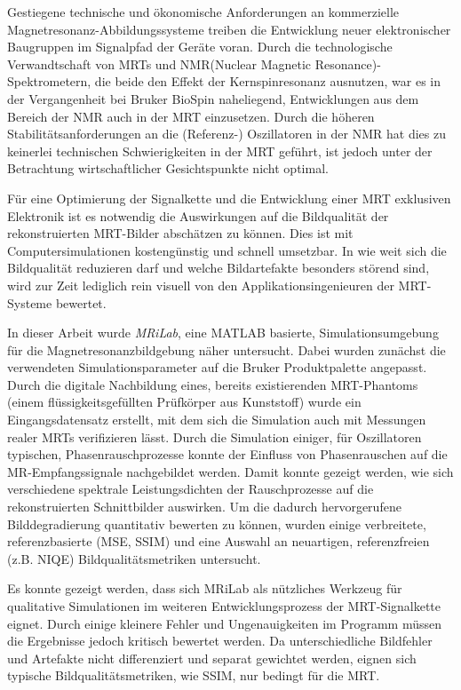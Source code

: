 Gestiegene technische und ökonomische Anforderungen an kommerzielle Magnetresonanz-Abbildungssysteme treiben die Entwicklung neuer elektronischer Baugruppen im Signalpfad der Geräte voran. Durch die technologische Verwandtschaft von MRTs und NMR(Nuclear Magnetic Resonance)-Spektrometern, die beide den Effekt der Kernspinresonanz ausnutzen, war es in der Vergangenheit bei Bruker BioSpin naheliegend, Entwicklungen aus dem Bereich der NMR auch in der MRT einzusetzen. Durch die höheren Stabilitätsanforderungen an die (Referenz-) Oszillatoren in der NMR hat dies zu keinerlei technischen Schwierigkeiten in der MRT geführt, ist jedoch unter der Betrachtung wirtschaftlicher Gesichtspunkte nicht optimal.

Für eine Optimierung der Signalkette und die Entwicklung einer MRT exklusiven Elektronik ist es notwendig die Auswirkungen auf die Bildqualität der rekonstruierten MRT-Bilder abschätzen zu können. Dies ist mit Computersimulationen kostengünstig und schnell umsetzbar. In wie weit sich die Bildqualität reduzieren darf und welche Bildartefakte besonders störend sind, wird zur Zeit lediglich rein visuell von den Applikationsingenieuren der MRT-Systeme bewertet.

In dieser Arbeit wurde \textit{MRiLab}, eine MATLAB basierte, Simulationsumgebung für die Magnetresonanzbildgebung näher untersucht. Dabei wurden zunächst die verwendeten Simulationsparameter auf die Bruker Produktpalette angepasst. Durch die digitale Nachbildung eines, bereits existierenden MRT-Phantoms (einem flüssigkeitsgefüllten Prüfkörper aus Kunststoff) wurde ein Eingangsdatensatz erstellt, mit dem sich die Simulation auch mit Messungen realer MRTs verifizieren lässt. Durch die Simulation einiger, für Oszillatoren typischen, Phasenrauschprozesse konnte der Einfluss von Phasenrauschen auf die MR-Empfangssignale nachgebildet werden. Damit konnte gezeigt werden, wie sich verschiedene spektrale Leistungsdichten der Rauschprozesse auf die rekonstruierten Schnittbilder auswirken.
Um die dadurch hervorgerufene Bilddegradierung quantitativ bewerten zu können, wurden einige verbreitete, referenzbasierte (MSE, SSIM) und eine Auswahl an neuartigen, referenzfreien (z.B. NIQE) Bildqualitätsmetriken untersucht.

Es konnte gezeigt werden, dass sich MRiLab als nützliches Werkzeug für qualitative Simulationen im weiteren Entwicklungsprozess der MRT-Signalkette eignet. Durch einige kleinere Fehler und Ungenauigkeiten im Programm müssen die Ergebnisse jedoch kritisch bewertet werden. Da unterschiedliche Bildfehler und Artefakte nicht differenziert und separat gewichtet werden, eignen sich typische Bildqualitätsmetriken, wie SSIM, nur bedingt für die MRT.

